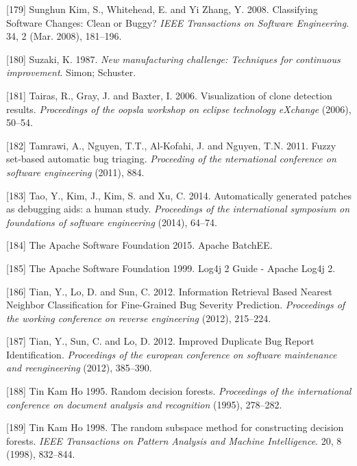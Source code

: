 \documentclass[12pt]{report}
\begin{document}
\hypertarget{ref-SunghunKim2008}{}
{[}179{]} Sunghun Kim, S., Whitehead, E. and Yi Zhang, Y. 2008.
Classifying Software Changes: Clean or Buggy? \emph{IEEE Transactions on
Software Engineering}. 34, 2 (Mar. 2008), 181--196.

\hypertarget{ref-suzaki1987new}{}
{[}180{]} Suzaki, K. 1987. \emph{New manufacturing challenge: Techniques
for continuous improvement}. Simon; Schuster.

\hypertarget{ref-Tairas2006a}{}
{[}181{]} Tairas, R., Gray, J. and Baxter, I. 2006. Visualization of
clone detection results. \emph{Proceedings of the oopsla workshop on
eclipse technology eXchange} (2006), 50--54.

\hypertarget{ref-Tamrawi2011a}{}
{[}182{]} Tamrawi, A., Nguyen, T.T., Al-Kofahi, J. and Nguyen, T.N.
2011. Fuzzy set-based automatic bug triaging. \emph{Proceeding of the
nternational conference on software engineering} (2011), 884.

\hypertarget{ref-tao2014automatically}{}
{[}183{]} Tao, Y., Kim, J., Kim, S. and Xu, C. 2014. Automatically
generated patches as debugging aids: a human study. \emph{Proceedings of
the international symposium on foundations of software engineering}
(2014), 64--74.

\hypertarget{ref-TheApacheSoftwareFoundation2015}{}
{[}184{]} The Apache Software Foundation 2015. Apache BatchEE.

\hypertarget{ref-TheApacheSoftwareFoundation1999}{}
{[}185{]} The Apache Software Foundation 1999. Log4j 2 Guide - Apache
Log4j 2.

\hypertarget{ref-Tian2012}{}
{[}186{]} Tian, Y., Lo, D. and Sun, C. 2012. Information Retrieval Based
Nearest Neighbor Classification for Fine-Grained Bug Severity
Prediction. \emph{Proceedings of the working conference on reverse
engineering} (2012), 215--224.

\hypertarget{ref-Tian2012a}{}
{[}187{]} Tian, Y., Sun, C. and Lo, D. 2012. Improved Duplicate Bug
Report Identification. \emph{Proceedings of the european conference on
software maintenance and reengineering} (2012), 385--390.

\hypertarget{ref-TinKamHo}{}
{[}188{]} Tin Kam Ho 1995. Random decision forests. \emph{Proceedings of
the international conference on document analysis and recognition}
(1995), 278--282.

\hypertarget{ref-TinKamHo1998}{}
{[}189{]} Tin Kam Ho 1998. The random subspace method for constructing
decision forests. \emph{IEEE Transactions on Pattern Analysis and
Machine Intelligence}. 20, 8 (1998), 832--844.
\end{document}
